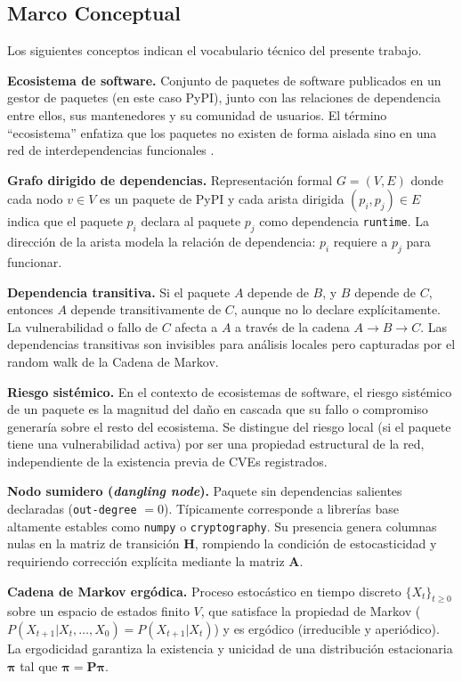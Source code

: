 \subsection{Marco Conceptual}

Los siguientes conceptos indican el vocabulario técnico del presente trabajo.

\textbf{Ecosistema de software.}
Conjunto de paquetes de software publicados en un gestor de paquetes (en este 
caso PyPI), junto con las relaciones de dependencia entre ellos, sus 
mantenedores y su comunidad de usuarios. El término ``ecosistema'' enfatiza 
que los paquetes no existen de forma aislada sino en una red de 
interdependencias funcionales \autocite{kikas2017structure}.

\textbf{Grafo dirigido de dependencias.}
Representación formal $G = (V, E)$ donde cada nodo $v \in V$ es un paquete 
de PyPI y cada arista dirigida $(p_i, p_j) \in E$ indica que el paquete 
$p_i$ declara al paquete $p_j$ como dependencia \texttt{runtime}. La 
dirección de la arista modela la relación de dependencia: $p_i$ requiere 
a $p_j$ para funcionar.

\textbf{Dependencia transitiva.}
Si el paquete $A$ depende de $B$, y $B$ depende de $C$, entonces $A$ 
depende transitivamente de $C$, aunque no lo declare explícitamente. La 
vulnerabilidad o fallo de $C$ afecta a $A$ a través de la cadena 
$A \to B \to C$. Las dependencias transitivas son invisibles para análisis 
locales pero capturadas por el random walk de la Cadena de Markov.

\textbf{Riesgo sistémico.}
En el contexto de ecosistemas de software, el riesgo sistémico de un paquete 
es la magnitud del daño en cascada que su fallo o compromiso generaría sobre 
el resto del ecosistema. Se distingue del riesgo local (si el paquete tiene 
una vulnerabilidad activa) por ser una propiedad estructural de la red, 
independiente de la existencia previa de CVEs registrados.

\textbf{Nodo sumidero (\textit{dangling node}).}
Paquete sin dependencias salientes declaradas (\texttt{out-degree} $= 0$). 
Típicamente corresponde a librerías base altamente estables como 
\texttt{numpy} o \texttt{cryptography}. Su presencia genera columnas nulas 
en la matriz de transición $\mathbf{H}$, rompiendo la condición de 
estocasticidad y requiriendo corrección explícita mediante la matriz 
$\mathbf{A}$.

\textbf{Cadena de Markov ergódica.}
Proceso estocástico en tiempo discreto $\{X_t\}_{t \geq 0}$ sobre un espacio 
de estados finito $V$, que satisface la propiedad de Markov 
($P(X_{t+1} | X_t, \ldots, X_0) = P(X_{t+1} | X_t)$) y es ergódico 
(irreducible y aperiódico). La ergodicidad garantiza la existencia y unicidad 
de una distribución estacionaria $\boldsymbol{\pi}$ tal que 
$\boldsymbol{\pi} = \mathbf{P}\boldsymbol{\pi}$.

